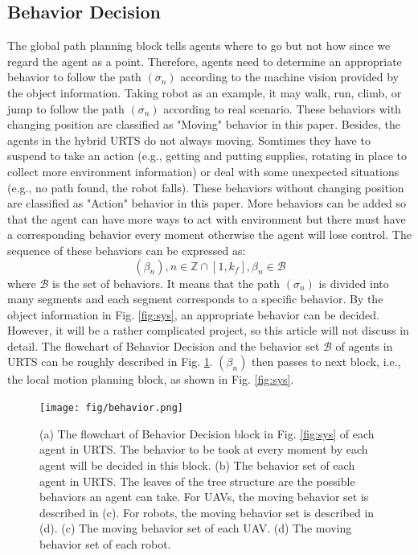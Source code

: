 \documentclass{ieeeaccess}
\begin{document}
\subsection{Behavior Decision}
The global path planning block tells agents where to go but not how since we regard the agent as a point. Therefore, agents need to determine an appropriate behavior to follow the path $(\sigma_n)$ according to the machine vision provided by the object information. Taking robot as an example, it may walk, run, climb, or jump to follow the path $(\sigma_n)$ according to real scenario. These behaviors with changing position are classified as "Moving" behavior in this paper. Besides, the agents in the hybrid URTS do not always moving. Somtimes they have to suspend to take an action (e.g., getting and putting supplies, rotating in place to collect more environment information) or deal with some unexpected situations (e.g., no path found, the robot falls). These behaviors without changing position are classified as "Action" behavior in this paper. More behaviors can be added so that the agent can have more ways to act with environment but there must have a corresponding behavior every moment otherwise the agent will lose control. The sequence of these behaviors can be expressed as:
\begin{equation}
    (\beta_n), n\in\mathbb{Z}\cap[1,k_f], \beta_n\in\mathcal{B}
\end{equation}
where $\mathcal{B}$ is the set of behaviors. It means that the path $(\sigma_n)$ is divided into many segments and each segment corresponds to a specific behavior. By the object information in Fig. \ref{fig:sys}, an appropriate behavior can be decided. However, it will be a rather complicated project, so this article will not discuss in detail. The flowchart of Behavior Decision and the behavior set $\mathcal{B}$ of agents in URTS can be roughly described in Fig. \ref{fig:behavior}. $(\beta_n)$ then passes to next block, i.e., the local motion planning block, as shown in Fig. \ref{fig:sys}.

\begin{figure}[htbp]
    \centering
    \texttt{[image: fig/behavior.png]}\caption{
        (a) The flowchart of Behavior Decision block in Fig. \ref{fig:sys} of each agent in URTS. The behavior to be took at every moment by each agent will be decided in this block. %
        (b) The behavior set of each agent in URTS. The leaves of the tree structure are the possible behaviors an agent can take. For UAVs, the moving behavior set is described in (c). For robots, the moving behavior set is described in (d). 
        (c) The moving behavior set of each UAV. 
        (d) The moving behavior set of each robot.}%
    \label{fig:behavior}
\end{figure}
\end{document}
